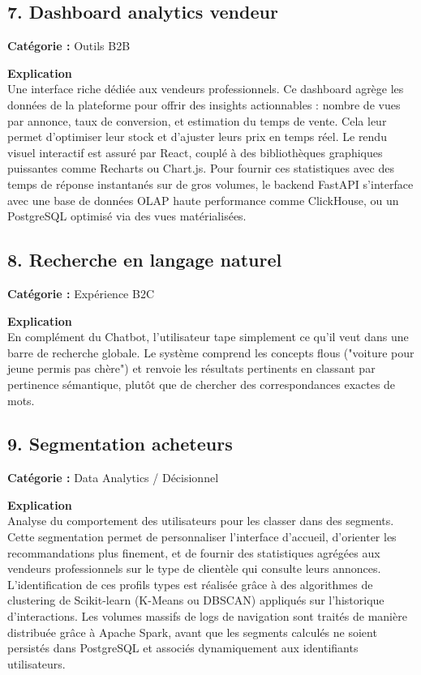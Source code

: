 \documentclass[11pt,a4paper]{article}
\begin{document}
\subsection{7. Dashboard analytics vendeur}
\textbf{Catégorie :} Outils B2B

\textbf{Explication}\\
Une interface riche dédiée aux vendeurs professionnels. Ce dashboard agrège les données de la plateforme pour offrir des insights actionnables : nombre de vues par annonce, taux de conversion, et estimation du temps de vente. Cela leur permet d'optimiser leur stock et d'ajuster leurs prix en temps réel. Le rendu visuel interactif est assuré par React, couplé à des bibliothèques graphiques puissantes comme Recharts ou Chart.js. Pour fournir ces statistiques avec des temps de réponse instantanés sur de gros volumes, le backend FastAPI s'interface avec une base de données OLAP haute performance comme ClickHouse, ou un PostgreSQL optimisé via des vues matérialisées.

\subsection{8. Recherche en langage naturel}
\textbf{Catégorie :} Expérience B2C

\textbf{Explication}\\
En complément du Chatbot, l'utilisateur tape simplement ce qu'il veut dans une barre de recherche globale. Le système comprend les concepts flous ("voiture pour jeune permis pas chère") et renvoie les résultats pertinents en classant par pertinence sémantique, plutôt que de chercher des correspondances exactes de mots.

\subsection{9. Segmentation acheteurs}
\textbf{Catégorie :} Data Analytics / Décisionnel

\textbf{Explication}\\
Analyse du comportement des utilisateurs pour les classer dans des segments. Cette segmentation permet de personnaliser l'interface d'accueil, d'orienter les recommandations plus finement, et de fournir des statistiques agrégées aux vendeurs professionnels sur le type de clientèle qui consulte leurs annonces. L'identification de ces profils types est réalisée grâce à des algorithmes de clustering de Scikit-learn (K-Means ou DBSCAN) appliqués sur l'historique d'interactions. Les volumes massifs de logs de navigation sont traités de manière distribuée grâce à Apache Spark, avant que les segments calculés ne soient persistés dans PostgreSQL et associés dynamiquement aux identifiants utilisateurs.
\end{document}
